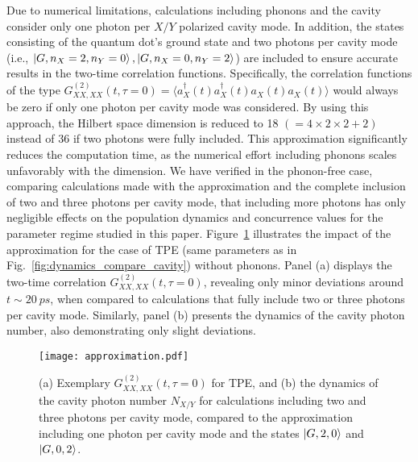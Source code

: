 \documentclass[%
 reprint,superscriptaddress,
 amsmath,amssymb,
 aps]{revtex4-2}
\begin{document}
Due to numerical limitations, calculations including phonons and the cavity consider only one photon per $X/Y$ polarized cavity mode. In addition, the states consisting of the quantum dot's ground state and two photons per cavity mode (i.e., $\ket{G, n_X=2, n_Y=0}, \ket{G,n_X=0,n_Y=2}$) are included to ensure accurate results in the two-time correlation functions. Specifically, the correlation functions of the type $G^{(2)}_{XX,XX}(t,\tau=0) = \langle a^{\dagger}_X(t)a^{\dagger}_X(t)a^{\phantom{\dagger}}_X(t)a^{\phantom{\dagger}}_X(t)\rangle$ would always be zero if only one photon per cavity mode was considered. By using this approach, the Hilbert space dimension is reduced to 18 $(=4\times2\times2 +2)$ instead of 36 if two photons were fully included. This approximation significantly reduces the computation time, as the numerical effort including phonons scales unfavorably with the dimension. We have verified in the phonon-free case, comparing calculations made with the approximation and the complete inclusion of two and three photons per cavity mode, that including more photons has only negligible effects on the population dynamics and concurrence values for the parameter regime studied in this paper. Figure~\ref{fig:approximation} illustrates the impact of the approximation for the case of TPE (same parameters as in Fig.~\ref{fig:dynamics_compare_cavity}) without phonons. Panel (a) displays the two-time correlation $G^{(2)}_{XX,XX}(t,\tau=0)$, revealing only minor deviations around $t\sim\SI{20}{ps}$, when compared to calculations that fully include two or three photons per cavity mode. Similarly, panel (b) presents the dynamics of the cavity photon number, also demonstrating only slight deviations.
\begin{figure}
    \centering
    \texttt{[image: approximation.pdf]}
    \caption{(a) Exemplary $G^{(2)}_{XX,XX}(t,\tau=0)$ for TPE, and (b) the dynamics of the cavity photon number $N_{X/Y}$ for calculations including two and three photons per cavity mode, compared to the approximation including one photon per cavity mode and the states $\ket{G,2,0}$ and $\ket{G,0,2}$.}
    \label{fig:approximation}
\end{figure}
\end{document}
